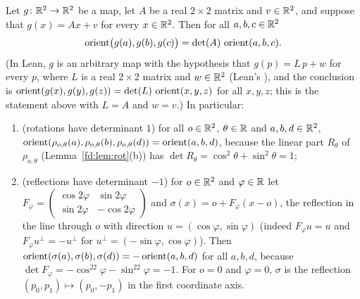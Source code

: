 \begin{lemma}\label{fd:lem:affine-orient}\sloppy
Let $g\colon\mathbb R^2\to\mathbb R^2$ be a map, let $A$ be a real $2\times2$ matrix and $v\in\mathbb R^2$, and suppose that
$g(x)=Ax+v$ for every $x\in\mathbb R^2$. Then for all $a,b,c\in\mathbb R^2$
\[
  \operatorname{orient}\bigl(g(a),g(b),g(c)\bigr)=\det(A)\,\operatorname{orient}(a,b,c).
\]
(In Lean, $g$ is an arbitrary map with the hypothesis that $g(p)=L\,p+w$ for every $p$, where $L$ is a
real $2\times2$ matrix and $w\in\mathbb R^2$ (Lean's ), and the conclusion is
$\operatorname{orient}(g(x),g(y),g(z))=\det(L)\,\operatorname{orient}(x,y,z)$ for all $x,y,z$; this is the statement above with
$L=A$ and $w=v$.)
In particular:
\begin{enumerate}[label=(\roman*)]
\item (rotations have determinant $1$) for all $o\in\mathbb R^2$, $\theta\in\mathbb R$ and $a,b,d\in\mathbb R^2$,
  $\operatorname{orient}(\rho_{o,\theta}(a),\rho_{o,\theta}(b),\rho_{o,\theta}(d))=\operatorname{orient}(a,b,d)$, because the linear part
  $R_\theta$ of $\rho_{o,\theta}$ (Lemma~\ref{fd:lem:rot}(b)) has $\det R_\theta=\cos^2\theta+\sin^2\theta=1$;
\item (reflections have determinant $-1$) for $o\in\mathbb R^2$ and $\varphi\in\mathbb R$ let
  $F_\varphi=\begin{pmatrix}\cos2\varphi&\sin2\varphi\\ \sin2\varphi&-\cos2\varphi\end{pmatrix}$ and
  $\sigma(x)=o+F_\varphi(x-o)$, the reflection in the line through $o$ with direction
  $u=(\cos\varphi,\sin\varphi)$ (indeed $F_\varphi u=u$ and $F_\varphi u^\perp=-u^\perp$ for
  $u^\perp=(-\sin\varphi,\cos\varphi)$). Then
  $\operatorname{orient}(\sigma(a),\sigma(b),\sigma(d))=-\operatorname{orient}(a,b,d)$ for all $a,b,d$, because
  $\det F_\varphi=-\cos^22\varphi-\sin^22\varphi=-1$. For $o=0$ and $\varphi=0$, $\sigma$ is the reflection
  $(p_0,p_1)\mapsto(p_0,-p_1)$ in the first coordinate axis.
\end{enumerate}
\end{lemma}

